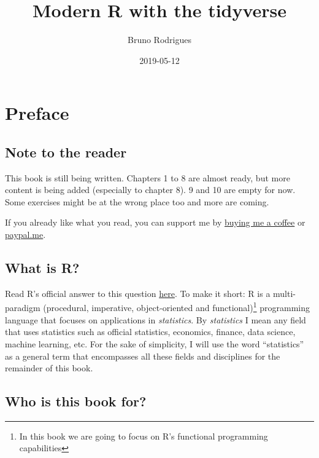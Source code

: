\documentclass[]{gitbook}
\title{Modern R with the tidyverse}
\author{Bruno Rodrigues}
\date{2019-05-12}
\let\rmarkdownfootnote\footnote%
\def\footnote{\protect\rmarkdownfootnote}
\begin{document}
\maketitle

{
\setcounter{tocdepth}{2}
\tableofcontents
}
\hypertarget{preface}{%
\section*{Preface}\label{preface}}

\hypertarget{note-to-the-reader}{%
\subsection*{Note to the reader}\label{note-to-the-reader}}

This book is still being written. Chapters 1 to 8 are almost ready, but more content is being added
(especially to chapter 8). 9 and 10 are empty for now. Some exercises might be at the wrong place
too and more are coming.

If you already like what you read, you can support
me by \href{https://www.buymeacoffee.com/brodriguesco}{buying me a coffee}
or \href{https://www.paypal.me/brodriguesco}{paypal.me}.

\hypertarget{what-is-r}{%
\subsection*{What is R?}\label{what-is-r}}

Read R's official answer to this question
\href{https://cran.r-project.org/doc/FAQ/R-FAQ.html\#What-is-R_003f}{here}. To make it short: R is a
multi-paradigm (procedural, imperative, object-oriented and functional)\footnote{In this book we are going
  to focus on R's functional programming capabilities} programming language that
focuses on applications in \emph{statistics}. By \emph{statistics} I mean any field that uses statistics such
as official statistics, economics, finance, data science, machine learning, etc. For the sake of
simplicity, I will use the word ``statistics'' as a general term that encompasses all these fields and
disciplines for the remainder of this book.

\hypertarget{who-is-this-book-for}{%
\subsection*{Who is this book for?}\label{who-is-this-book-for}}
\end{document}
